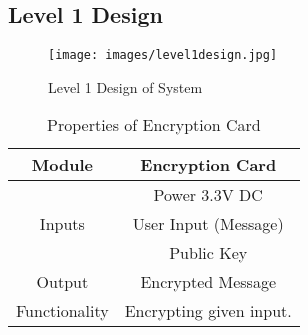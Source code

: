 \documentclass[12pt]{article}
\begin{document}
	\subsection{Level 1 Design}
	
	\begin{figure}[H]
		\centering
		\label{Level 1 Design of System }
		\texttt{[image: images/level1design.jpg]}\\[0.5 cm]	
		\caption{Level 1 Design of System } 		
	\end{figure}
\begin{table}[h]
	\centering
	
	\label{Properties of Encryption Card}
	\begin{tabular}{|c|c|}
		\hline
		Module & Encryption Card \\ \hline
		\multirow{3}{*}{Inputs} & Power 3.3V DC \\
		\cline{2-2}
		& User Input (Message) \\
		\cline{2-2}
		& Public Key \\ \hline
		Output & Encrypted Message \\ \hline
		Functionality & Encrypting given input.\\ \hline		
	\end{tabular}
	\caption{Properties of Encryption Card}
\end{table}
\end{document}
